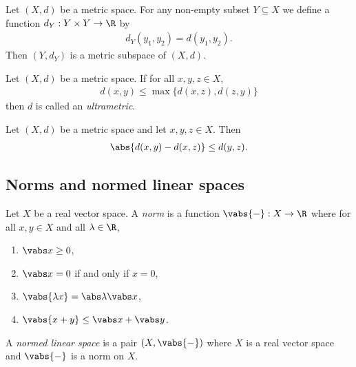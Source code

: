 \documentclass{article}
\begin{document}
\begin{definition}
    Let $(X,d)$ be a metric space. For any non-empty subset $Y\subseteq X$ we define 
    a function $d_Y:Y\times Y\to\R$ by
    \begin{align*}
        d_Y(y_1,y_2)=d(y_1,y_2).
    \end{align*}
    Then $(Y,d_Y)$ is a metric subspace of $(X,d)$.
\end{definition}

\begin{definition}[Ultrametric]
    Let $(X,d)$ be a metric space. If for all $x,y,z\in X$,
    \begin{align*}
        d(x,y)\leq \max\{d(x,z),d(z,y)\}
    \end{align*}
    then $d$ is called an \emph{ultrametric}.
\end{definition}

\begin{proposition}
   Let $(X,d)$ be a metric space and let $x,y,z\in X$. Then 
   \begin{align*}
       \abs{d(x,y)-d(x,z)}\leq d(y,z).
   \end{align*} 
\end{proposition}

\subsection{Norms and normed linear spaces}

\begin{definition}
    Let $X$ be a real vector space. A \emph{norm} is a function $\vabs{-}:X\to\R$
    where for all $x,y\in X$ and all $\lambda\in\R$,
    \begin{enumerate}
        \item $\vabs x \geq 0$,
        \item $\vabs x = 0$ if and only if $x = 0$,
        \item $\vabs{\lambda x}=\abs \lambda \vabs x$,
        \item $\vabs{x+y}\leq \vabs x +\vabs y$.
    \end{enumerate}
    A \emph{normed linear space} is a pair $(X,\vabs{-})$ where $X$ is a real vector 
    space and $\vabs{-}$ is a norm on $X$.
\end{definition}
\end{document}
